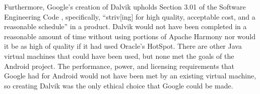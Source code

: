 \documentclass[12pt]{article}
\begin{document}
Furthermore, Google's creation of Dalvik upholds Section 3.01 of the Software
Engineering Code \cite{secode}, specifically, ``striv[ing] for high quality,
acceptable cost, and a reasonable schedule'' in a product.  Dalvik would not
have been completed in a reasonable amount of time without using portions of
Apache Harmony nor would it be as high of quality if it had used Oracle's
HotSpot.  There are other Java virtual machines that could have been used, but
none met the goals of the Android project.  The performance, power, and
licensing requirements that Google had for Android would not have been met by
an existing virtual machine, so creating Dalvik was the only ethical choice
that Google could be made.




\end{document}
